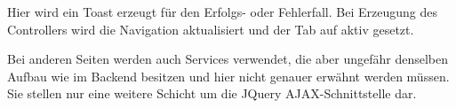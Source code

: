 Hier wird ein Toast erzeugt für den Erfolgs- oder Fehlerfall. Bei Erzeugung des Controllers wird die Navigation aktualisiert und der Tab auf aktiv gesetzt.

Bei anderen Seiten werden auch Services verwendet, die aber ungefähr denselben Aufbau wie im Backend besitzen und hier nicht genauer erwähnt werden müssen. Sie stellen nur eine weitere Schicht um die JQuery \gls{AJAX}-Schnittstelle dar.
